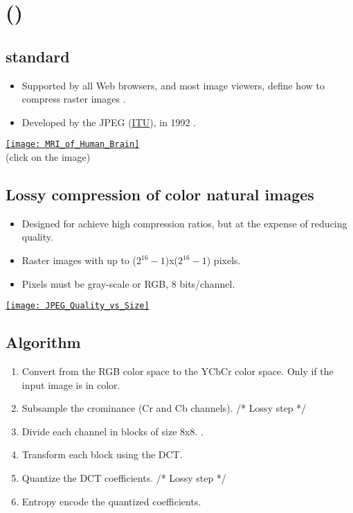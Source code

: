 \chapter{ ()}

\section{ standard}
\begin{itemize}
\item Supported by all Web browsers, and most image viewers, define
  how to compress raster images \cite{ccitt.t81,wikipedia_ITU}.
\item Developed by the \gls{JPEG} (\href{https://www.itu.int}{ITU}),
  in 1992 \cite{wikipedia_JPEG}.
\end{itemize}
\vspace{-2ex}
\begin{center}
  \href{https://en.wikipedia.org/wiki/Magnetic_resonance_imaging_of_the_brain#/media/File:MRI_of_Human_Brain.jpg}{\texttt{[image: MRI\_of\_Human\_Brain]}}\\
  (click on the image)
\end{center}

\section{Lossy compression of color natural images}
\begin{itemize}
\item Designed for achieve high compression ratios, but at the expense of reducing quality.
  \item Raster images with up to ($2^{16}-1$)x($2^{16}-1$) pixels.
  \item Pixels must be gray-scale or \gls{RGB}, 8 bits/channel.
\end{itemize}
\vspace{-2ex}
\begin{center}
  \href{https://www.thewebmaster.com/jpeg-definitive-guide/}{\texttt{[image: JPEG\_Quality\_vs\_Size]}}
\end{center}

\section{Algorithm}
\begin{enumerate}
\item Convert from the \gls{RGB} color space to the \gls{YCbCr} color
  space. Only if the input image is in color.
\item Subsample the crominance (Cr and Cb channels). /* Lossy step */
\item Divide each channel in blocks of size 8x8. .
\item Transform each block using the \gls{DCT}.
\item Quantize the \gls{DCT} coefficients. /* Lossy step */
\item Entropy encode the quantized coefficients.
\end{enumerate}

